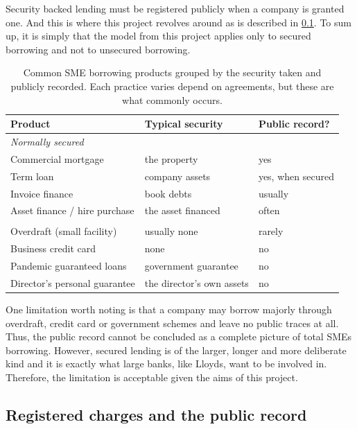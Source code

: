 \documentclass[ %
                    author={Natchalin Iwsakul \\ Inkaphol Siriwongwattana \\ Tanaphan Kummaraphat \\ Patorn Srisupap},
                supervisor={Fernando Moreno-Pino},
                    degree={MSc},
                     title={Propensity Modelling for SME Commercial Lending Using Open Public Data},
                  subtitle={Companies House filings and GDELT media coverage as predictors of first-time borrowing},
                      type={},
                      year={2026}]{dissertation}
\begin{document}
Security backed lending must be registered publicly when a company is granted one. And this is where this project revolves around as is described in \ref{sec:charges}. To sum up, it is simply that the model from this project applies only to secured borrowing and not to unsecured borrowing.

\begin{table}[H]
\centering
\begin{tabular}{lll}
\toprule
Product & Typical security & Public record? \\
\midrule
\multicolumn{3}{l}{\itshape Normally secured} \\
Commercial mortgage            & the property         & yes \\
Term loan                      & company assets       & yes, when secured \\
Invoice finance                & book debts           & usually \\
Asset finance / hire purchase  & the asset financed   & often \\
\addlinespace
\multicolumn{3}{l}{\itshape Normally unsecured} \\
Overdraft (small facility)     & usually none              & rarely \\
Business credit card           & none                      & no \\
Pandemic guaranteed loans      & government guarantee      & no \\
Director's personal guarantee  & the director's own assets & no \\
\bottomrule
\end{tabular}
\caption[SME borrowing products and the public record]{Common SME borrowing
products grouped by the security taken and publicly recorded. Each practice varies depend on agreements, but these are what commonly occurs.}
\label{tab:products}
\end{table}

One limitation worth noting is that a company may borrow majorly through overdraft, credit card or government schemes and leave no public traces at all. Thus, the public record cannot be concluded as a complete picture of total SMEs borrowing. However, secured lending is of the larger, longer and more deliberate kind and it is exactly what large banks, like Lloyds, want to be involved in. Therefore, the limitation is acceptable given the aims of this project.

\subsection{Registered charges and the public record}
\label{sec:charges}
\end{document}
